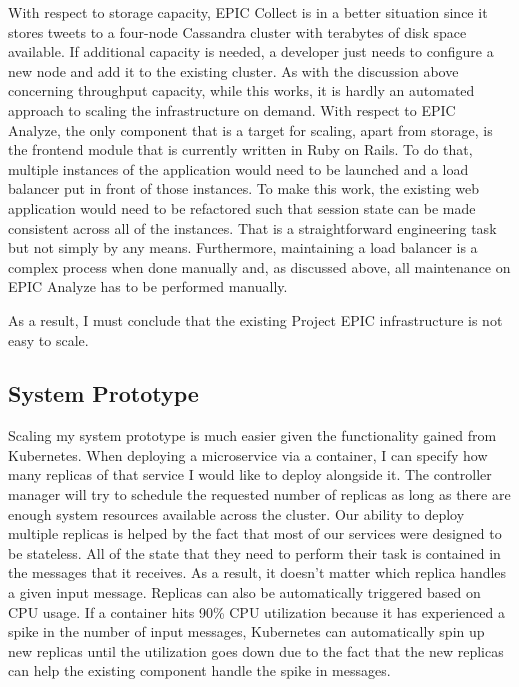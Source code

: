 With respect to storage capacity, EPIC Collect is in a better situation since it stores tweets to a four-node Cassandra cluster with terabytes of disk space available. If additional capacity is needed, a developer just needs to configure a new node and add it to the existing cluster. As with the discussion above concerning throughput capacity, while this works, it is hardly an automated approach to scaling the infrastructure on demand.
With respect to EPIC Analyze, the only component that is a target for scaling, apart from storage, is the frontend module that is currently written in Ruby on Rails. To do that, multiple instances of the application would need to be launched and a load balancer put in front of those instances. To make this work, the existing web application would need to be refactored such that session state can be made consistent across all of the instances. That is a straightforward engineering task but not simply by any means. Furthermore, maintaining a load balancer is a complex process when done manually and, as discussed above, all maintenance on EPIC Analyze has to be performed manually.

As a result, I must conclude that the existing Project EPIC infrastructure is not easy to scale.

\subsection{System Prototype}

Scaling my system prototype is much easier given the functionality gained from Kubernetes. When deploying a microservice via a container, I can specify how many replicas of that service I would like to deploy alongside it. The controller manager will try to schedule the requested number of replicas as long as there are enough system resources available across the cluster. Our ability to deploy multiple replicas is helped by the fact that most of our services were designed to be stateless. All of the state that they need to perform their task is contained in the messages that it receives. As a result, it doesn’t matter which replica handles a given input message. Replicas can also be automatically triggered based on CPU usage. If a container hits 90\% CPU utilization because it has experienced a spike in the number of input messages, Kubernetes can automatically spin up new replicas until the utilization goes down due to the fact that the new replicas can help the existing component handle the spike in messages.

